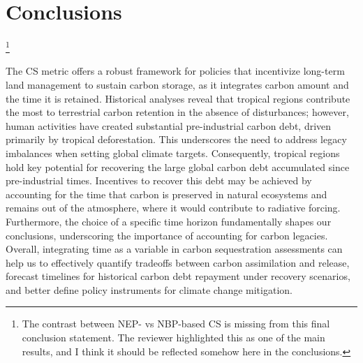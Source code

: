 \documentclass[ProofPDF]{./Styles/Jnls-Template-V3}
\begin{document}
\section{Conclusions}\footnote{The contrast between NEP- vs NBP-based CS is missing from this final conclusion statement. The reviewer highlighted this as one of the main results, and I think it should be reflected somehow here in the conclusions. }

The CS metric offers a robust framework for policies that incentivize long-term land management to sustain carbon storage, as it integrates carbon amount and the time it is retained. Historical analyses reveal that tropical regions contribute the most to terrestrial carbon retention in the absence of disturbances; however, human activities have created substantial pre-industrial carbon debt, driven primarily by tropical deforestation. This underscores the need to address legacy imbalances when setting global climate targets. Consequently, tropical regions hold key potential for recovering the large global carbon debt accumulated since pre-industrial times. Incentives to recover this debt may be achieved by accounting for the time that carbon is preserved in natural ecosystems and remains out of the atmosphere, where it would contribute to radiative forcing. Furthermore, the choice of a specific time horizon fundamentally shapes our conclusions, underscoring the importance of accounting for carbon legacies. Overall, integrating time as a variable in carbon sequestration assessments can help us to effectively quantify tradeoffs between carbon assimilation and release, forecast timelines for historical carbon debt repayment under recovery scenarios, and better define policy instruments for climate change mitigation.

\end{document}
